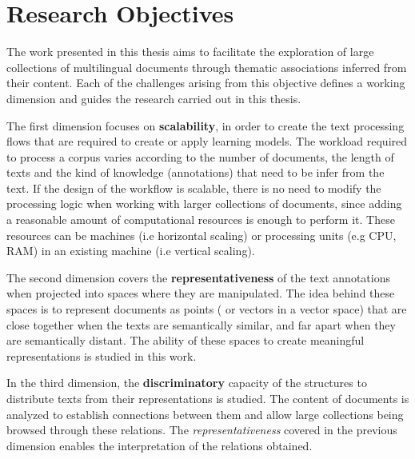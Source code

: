 

\chapter{Research Objectives}\label{ch:hypothesis}

\graphicspath{{hypothesis/figures/}}


The work presented in this thesis aims to facilitate the exploration of large collections of multilingual documents through thematic associations inferred from their content. Each of the challenges arising from this objective defines a working dimension and guides the research carried out in this thesis.

The first dimension focuses on \textbf{scalability}, in order to create the text processing flows that are  required to create or apply learning models. The workload required to process a corpus varies according to the number of documents, the length of texts and the kind of knowledge (annotations) that need to be infer from the text. If the design of the workflow is scalable, there is no need to modify the processing logic when working with larger collections of documents, since adding a reasonable amount of computational resources is enough to perform it. These resources can be machines (i.e horizontal scaling) or processing units (e.g CPU, RAM) in an existing machine (i.e vertical scaling). 

The second dimension covers the \textbf{representativeness} of the text annotations when projected into spaces where they are manipulated. The idea behind these spaces is to represent documents as points ( or vectors in a vector space) that are close together when the texts are semantically similar, and far apart when they are semantically distant. The ability of these spaces to create meaningful representations is studied in this work.

In the third dimension, the \textbf{discriminatory} capacity of the structures to distribute texts from their representations is studied. The content of documents is analyzed to establish connections between them and allow large collections being browsed through these relations. The \textit{representativeness} covered in the previous dimension enables the interpretation of the relations obtained.

